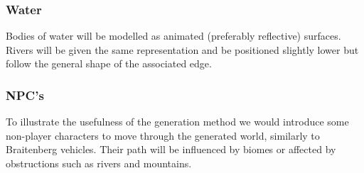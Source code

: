 \subsubsection{Water}

Bodies of water will be modelled as animated (preferably reflective) surfaces. Rivers will be given the same representation and be positioned slightly lower but follow the general shape of the associated edge.

\subsubsection{NPC's}

To illustrate the usefulness of the generation method we would introduce some non-player characters to move through the generated world, similarly to Braitenberg vehicles. Their path will be influenced by biomes or affected by obstructions such as rivers and mountains.